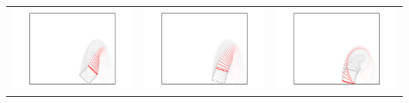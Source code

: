 \documentclass[11pt]{article}
\begin{document}
\begin{center}
\begin{tabular}{ccc}
\includegraphics[scale = 0.26]{simA_03.pdf} & \includegraphics[scale = 0.26]{simB_03.pdf} & \includegraphics[scale = 0.26]{simC_03.pdf} \\

\end{tabular}
\end{center}
\end{document}
